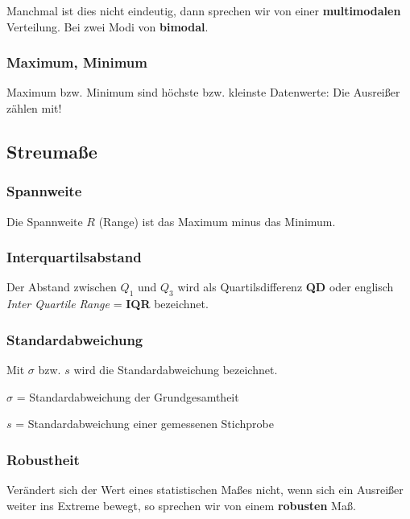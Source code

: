 \begin{multicols}{2}
Manchmal ist dies nicht eindeutig, dann sprechen wir von einer
\textbf{multimodalen} Verteilung. Bei zwei Modi von \textbf{bimodal}.

\subsubsection*{Maximum, Minimum}
Maximum bzw. Minimum sind höchste bzw. kleinste Datenwerte: Die Ausreißer
zählen mit!

\subsection*{Streumaße}
\subsubsection*{Spannweite}
Die Spannweite $R$ (Range) ist das Maximum minus
das Minimum.

\subsubsection*{Interquartilsabstand}
Der Abstand zwischen $Q_1$ und $Q_3$ wird als
Quartilsdifferenz \textbf{QD} oder
englisch \textit{Inter Quartile Range} = \textbf{IQR} bezeichnet.

\subsubsection*{Standardabweichung}
Mit $\sigma$ bzw. $s$ wird die Standardabweichung bezeichnet.

$\sigma$ = Standardabweichung der Grundgesamtheit

$s$ = Standardabweichung einer gemessenen Stichprobe 


\subsubsection*{Robustheit}
Verändert sich der Wert eines statistischen Maßes nicht, wenn sich ein Ausreißer
weiter ins Extreme bewegt, so sprechen wir von einem \textbf{robusten} Maß.

%


\end{multicols}
